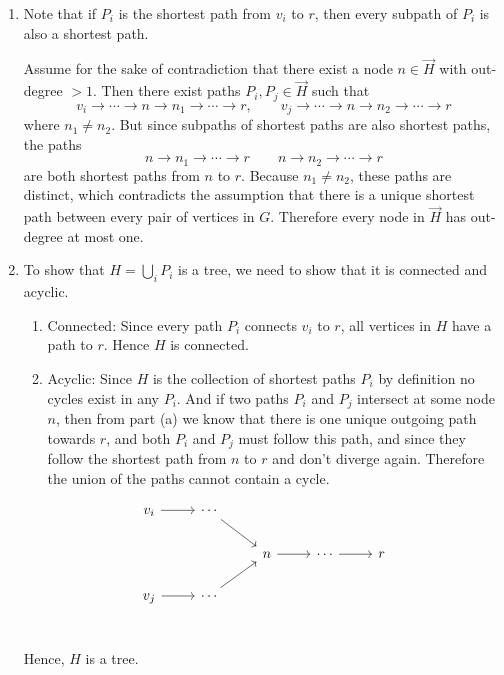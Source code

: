 \documentclass[12pt]{article}
\begin{document}
\begin{solution}
    \bbni 
    \begin{enumerate}
        \item Note that if $P_i$ is the shortest path from $v_i$ to $r$, then every subpath of $P_i$ is also a shortest path. 
        
        Assume for the sake of contradiction that there exist a node $n \in \vec{H}$ with out-degree $> 1$. Then there exist paths $P_i, P_j \in \vec{H}$ such that 
        \[v_i \to \cdots \to n \to n_1 \to \cdots \to r, \qquad v_j \to \cdots \to n \to n_2 \to \cdots \to r\]
        where $n_1 \neq n_2$. But since subpaths of shortest paths are also shortest paths, the paths 
        \[n \to n_1 \to \cdots \to r \qquad n \to n_2 \to \cdots \to r\]
        are both shortest paths from $n$ to $r$. Because $n_1 \neq n_2$, these paths are distinct, which contradicts the assumption that there is a unique shortest path between every pair of vertices in $G$. Therefore every node in $\vec{H}$ has out-degree at most one.

        \item To show that $H = \underset{i}{\bigcup} P_i$ is a tree, we need to show that it is connected and acyclic. 
        \begin{enumerate}
            \item Connected: Since every path $P_i$ connects $v_i$ to $r$, all vertices in $H$ have a path to $r$. Hence $H$ is connected.
            \item Acyclic: Since $H$ is the collection of shortest paths $P_i$ by definition no cycles exist in any $P_i$. And if two paths $P_i$ and $P_j$ intersect at some node $n$, then from part (a) we know that there is one unique outgoing path towards $r$, and both $P_i$ and $P_j$ must follow this path, and since they follow the shortest path from $n$ to $r$ and don't diverge again. Therefore the union of the paths cannot contain a cycle.
        \end{enumerate}

         \[
        \begin{tikzcd}
        v_i \arrow[r] & \cdots \arrow[dr] & {}  & {}\\
        {} & {} & n \arrow[r] & \cdots \arrow[r] & r\\
        v_j \arrow[r] & \cdots \arrow[ur] & {}  & {}\\
        \end{tikzcd}
        \]
 

        Hence, $H$ is a tree. 
    \end{enumerate}
\end{solution}
\end{document}
